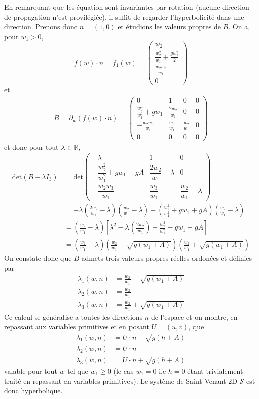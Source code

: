 \documentclass[
	french,
	11pt, %
]{fphw}
\newcommand{\mymat}[9]{\begin{pmatrix} #1 & #2 & #3 \\ #4 & #5 & #6 \\ #7 & #8 &#9 \end{pmatrix}}  %
\renewcommand{\vector}[4]{\begin{pmatrix} #1  \\ #2 \\ #3 \\ #4 \end{pmatrix}}   %
\begin{document}
En remarquant que les équation sont invariantes par rotation (aucune direction de propagation n'est provilégiée), il suffit de regarder l'hyperbolicité dans une direction. Prenons donc $n=(1,0)$ et étudions les valeurs propres de $B$. On a, pour $w_1 > 0$,
$$f(w)\cdot n = f_1(w) = \vector{w_2}{\frac{w_2^2}{w_1} + \frac{gw_1^2}{2}}{\frac{w_2w_3}{w_1}}{0}$$
et 
\begin{align*}
	B = \partial_w \left( f(w)\cdot n \right) = \begin{pmatrix} 0 & 1 & 0 & 0 \\ \frac{w_2^2}{w_1^2}+gw_1 & \frac{2w_2}{w_1} & 0 & 0 \\ -\frac{w_2w_3}{w_1} & \frac{w_3}{w_1} & \frac{w_2}{w_1} & 0 \\ 0 & 0 & 0 & 0 \end{pmatrix}
\end{align*}
et donc pour tout $\lambda \in \mathbb{R} $,
\begin{align*}
	\text{det}(B-\lambda I_3) &= \text{det} \mymat{-\lambda}{1}{0}{-\dfrac{w_2^2}{w_1^2}+gw_1+gA}{\dfrac{2w_2}{w_1}-\lambda}{0}{-\dfrac{w_2w_3}{w_1}}{\dfrac{w_3}{w_1}}{\dfrac{w_2}{w_1}-\lambda}  \\
	&= -\lambda \left( \frac{2w_2}{w_1} -\lambda \right)\left( \frac{w_2}{w_1} -\lambda \right) + \left( \frac{w_2^2}{w_1^2} +gw_1 +gA \right)\left( \frac{w_2}{w_1} -\lambda \right)     \\
	&= \left( \frac{w_2}{w_1} -\lambda \right) \left[ \lambda^2 - \lambda \left(\frac{2w_2}{w_1}\right) + \frac{w_2^2}{w_1^2}-gw_1-gA  \right] \\
	&= \left( \frac{w_2}{w_1} -\lambda \right) \left( \frac{w_2}{w_1} - \sqrt{g(w_1 + A)} \right) \left( \frac{w_2}{w_1} + \sqrt{g(w_1 + A)} \right)
\end{align*}
On constate donc que $B$ admets trois valeurs propres réelles ordonées et définies par 
\begin{align*}
	\lambda_1(w,n) &= \frac{w_2}{w_1} - \sqrt{g(w_1 + A)} \\
	\lambda_2(w,n) &= \frac{w_2}{w_1} \\
	\lambda_3(w,n) &= \frac{w_2}{w_1} + \sqrt{g(w_1 + A)}
\end{align*}
Ce calcul se généralise a toutes les directions $n$ de l'espace et on montre, en repassant aux variables primitives et en posant $U = (u,v)$, que 
\begin{align*}
	\lambda_1(w,n) &= U\cdot n - \sqrt{g(h + A)} \\
	\lambda_2(w,n) &= U\cdot n \\
	\lambda_3(w,n) &= U\cdot n + \sqrt{g(h + A)}
\end{align*}
valable pour tout $w$ tel que $w_1 \geq 0$ (le cas $w_1 = 0$ i.e $h=0$ étant trivialement traité en repassant en variables primitives). Le système de Saint-Venant 2D $\mathcal{S}$ est donc hyperbolique.
\end{document}
